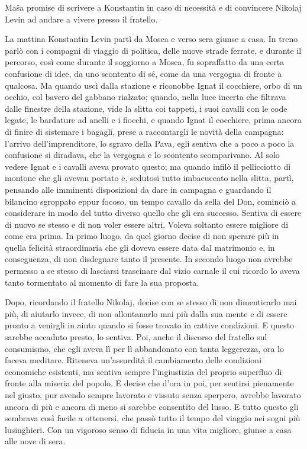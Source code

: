 Maša promise di scrivere a Konstantin in caso di necessità e di convincere Nikolaj Levin ad andare a vivere presso il fratello. 

\label{xxvi} 

La mattina Konstantin Levin partì da Mosca e verso sera giunse a casa. In treno parlò con i compagni di viaggio di politica, delle nuove strade ferrate, e durante il percorso, così come durante il soggiorno a Mosca, fu sopraffatto da una certa confusione di idee, da uno scontento di sé, come da una vergogna di fronte a qualcosa. Ma quando uscì dalla stazione e riconobbe Ignat il cocchiere, orbo di un occhio, col bavero del gabbano rialzato; quando, nella luce incerta che filtrava dalle finestre della stazione, vide la slitta coi tappeti, i suoi cavalli con le code legate, le bardature ad anelli e i fiocchi, e quando Ignat il cocchiere, prima ancora di finire di sistemare i bagagli, prese a raccontargli le novità della campagna: l'arrivo dell'imprenditore, lo sgravo della Pava, egli sentiva che a poco a poco la confusione si diradava, che la vergogna e lo scontento scomparivano. Al solo vedere Ignat e i cavalli aveva provato questo; ma quando infilò il pellicciotto di montone che gli avevan portato e, sedutosi tutto imbacuccato nella slitta, partì, pensando alle imminenti disposizioni da dare in campagna e guardando il bilancino sgroppato eppur focoso, un tempo cavallo da sella del Don, cominciò a considerare in modo del tutto diverso quello che gli era successo. Sentiva di essere di nuovo se stesso e di non voler essere altri. Voleva soltanto essere migliore di come era prima. In primo luogo, da quel giorno decise di non sperare più in quella felicità straordinaria che gli doveva essere data dal matrimonio e, in conseguenza, di non disdegnare tanto il presente. In secondo luogo non avrebbe permesso a se stesso di lasciarsi trascinare dal vizio carnale il cui ricordo lo aveva tanto tormentato al momento di fare la sua proposta. 

Dopo, ricordando il fratello Nikolaj, decise con se stesso di non dimenticarlo mai più, di aiutarlo invece, di non allontanarlo mai più dalla sua mente e di essere pronto a venirgli in aiuto quando si fosse trovato in cattive condizioni. E questo sarebbe accaduto presto, lo sentiva. Poi, anche il discorso del fratello sul consumismo, che egli aveva lì per lì abbandonato con tanta leggerezza, ora lo faceva meditare. Riteneva un'assurdità il cambiamento delle condizioni economiche esistenti, ma sentiva sempre l'ingiustizia del proprio superfluo di fronte alla miseria del popolo. E decise che d'ora in poi, per sentirsi pienamente nel giusto, pur avendo sempre lavorato e vissuto senza sperpero, avrebbe lavorato ancora di più e ancora di meno si sarebbe consentito del lusso. E tutto questo gli sembrava così facile a ottenersi, che passò tutto il tempo del viaggio nei sogni più lusinghieri. Con un vigoroso senso di fiducia in una vita migliore, giunse a casa alle nove di sera. 

